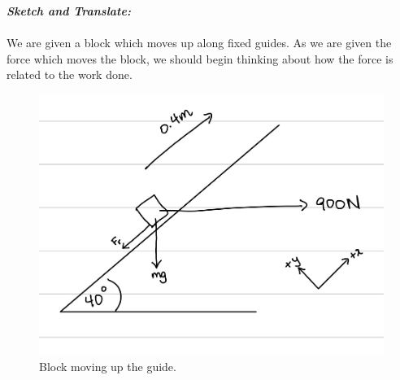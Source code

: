 \begin{subquestions}
\subquestion

\begin{subsubquestions}

\subsubquestion

\textbf{\textit{Sketch and Translate:}} \\ \\
We are given a block which moves up along fixed guides. As we are given the force which moves the block, we should begin thinking about how the force is related to the work done.
\begin{figure}[H]
	\begin{center}
		\includegraphics[scale=0.25]{../2011/figures/2011q6-1}
		\caption{\label{2011:q6:Sketch2} Block moving up the guide.}
	\end{center}
\end{figure}
	
	
	

\end{subsubquestions}
\end{subquestions}
